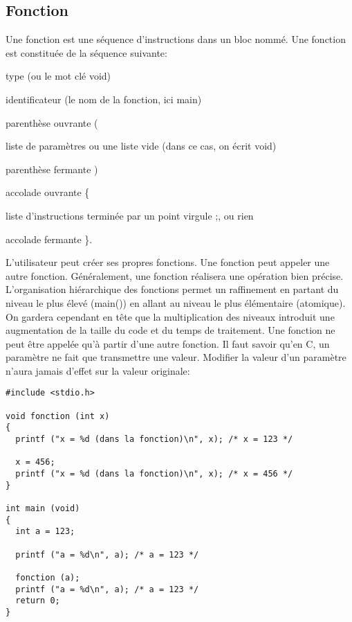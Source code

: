 \documentclass[a4paper]{article}
\begin{document}
\subsection{Fonction}
Une fonction est une séquence d'instructions dans un bloc nommé. Une fonction est constituée de la séquence suivante:
\begin{description}
  \item type (ou le mot clé void)
  \item identificateur (le nom de la fonction, ici main)
  \item parenthèse ouvrante \guillemotleft{} (\guillemotright{}
  \item liste de paramètres ou une liste vide (dans ce cas, on écrit void)
  \item parenthèse fermante \guillemotleft{}) \guillemotright{}
  \item accolade ouvrante \guillemotleft{}\{\guillemotright{}
  \item liste d'instructions terminée par un point virgule \guillemotleft{};\guillemotright{}, ou rien
  \item accolade fermante \guillemotleft{}\}\guillemotright{}.
\end{description}
  L'utilisateur peut créer ses propres fonctions. Une fonction peut appeler une autre fonction. Généralement, une fonction réalisera une opération bien précise. L'organisation hiérarchique des fonctions permet un raffinement en partant du niveau le plus élevé (main()) en allant au niveau le plus élémentaire (atomique).\newline
On gardera cependant en tête que la multiplication des niveaux introduit une augmentation de la taille du code et du temps de traitement.\newline
Une fonction ne peut être appelée qu'à partir d'une autre fonction.\newline
Il faut savoir qu'en C, un paramètre ne fait que transmettre une valeur. Modifier la valeur d'un paramètre n'aura jamais d'effet sur la valeur originale:
\begin{lstlisting}
#include <stdio.h>

void fonction (int x)
{
  printf ("x = %d (dans la fonction)\n", x); /* x = 123 */
  
  x = 456;
  printf ("x = %d (dans la fonction)\n", x); /* x = 456 */
}

int main (void)
{
  int a = 123;

  printf ("a = %d\n", a); /* a = 123 */

  fonction (a);
  printf ("a = %d\n", a); /* a = 123 */
  return 0;
}  
\end{lstlisting}
\end{document}
